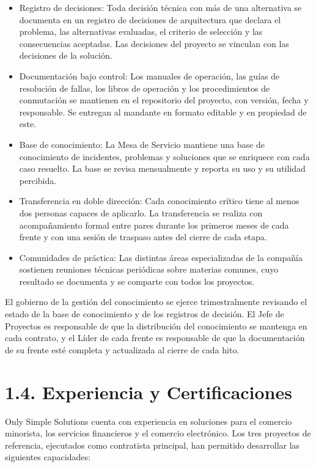 \documentclass[11pt]{article}
\providecommand{\tightlist}{%
  \setlength{\itemsep}{0pt}\setlength{\parskip}{0pt}}
\begin{document}
\begin{itemize}
\tightlist
\item
  Registro de decisiones: Toda decisión técnica con más de una alternativa se documenta en un registro de decisiones de arquitectura que declara el problema, las alternativas evaluadas, el criterio de selección y las consecuencias aceptadas. Las decisiones del proyecto se vinculan con las decisiones de la solución.
\item
  Documentación bajo control: Los manuales de operación, las guías de resolución de fallas, los libros de operación y los procedimientos de conmutación se mantienen en el repositorio del proyecto, con versión, fecha y responsable. Se entregan al mandante en formato editable y en propiedad de este.
\item
  Base de conocimiento: La Mesa de Servicio mantiene una base de conocimiento de incidentes, problemas y soluciones que se enriquece con cada caso resuelto. La base se revisa mensualmente y reporta su uso y su utilidad percibida.
\item
  Transferencia en doble dirección: Cada conocimiento crítico tiene al menos dos personas capaces de aplicarlo. La transferencia se realiza con acompañamiento formal entre pares durante los primeros meses de cada frente y con una sesión de traspaso antes del cierre de cada etapa.
\item
  Comunidades de práctica: Las distintas áreas especializadas de la compañía sostienen reuniones técnicas periódicas sobre materias comunes, cuyo resultado se documenta y se comparte con todos los proyectos.
\end{itemize}

El gobierno de la gestión del conocimiento se ejerce trimestralmente revisando el estado de la base de conocimiento y de los registros de decisión. El Jefe de Proyectos es responsable de que la distribución del conocimiento se mantenga en cada contrato, y el Líder de cada frente es responsable de que la documentación de su frente esté completa y actualizada al cierre de cada hito.

\section{1.4. Experiencia y Certificaciones}\label{experiencia-y-certificaciones}

Only Simple Solutions cuenta con experiencia en soluciones para el comercio minorista, los servicios financieros y el comercio electrónico. Los tres proyectos de referencia, ejecutados como contratista principal, han permitido desarrollar las siguientes capacidades:
\end{document}
